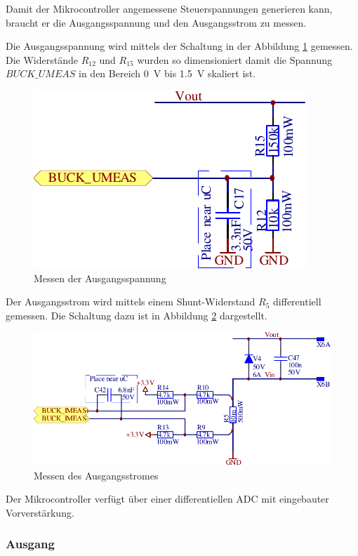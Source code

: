 Damit der Mikrocontroller angemessene Steuerspannungen  generieren kann, braucht
er die Ausgangsspannung und den Ausgangsstrom zu messen.

Die   Ausgangsspannung   wird   mittels   der   Schaltung   in   der   Abbildung
\ref{fig:circuit:buck:umeas} gemessen. Die Widerst\"ande $R_{12}$  und  $R_{15}$
wurden  so  dimensioniert  damit  die  Spannung  $BUCK\_UMEAS$  in  den  Bereich
\SI{0}{\volt} bis \SI{1.5}{\volt} skaliert ist.

\begin{figure}[th!]
    \center
    \includegraphics[width=.45\textwidth]{images/circuit/buck-umeas.pdf}
    \caption{Messen der Ausgangsspannung}
    \label{fig:circuit:buck:umeas}
\end{figure}

Der  Ausgangsstrom  wird  mittels  einem  Shunt-Widerstand  $R_5$  differentiell
gemessen.  Die  Schaltung dazu  ist  in  Abbildung  \ref{fig:circuit:buck:imeas}
dargestellt.

\begin{figure}[th!]
    \center
    \includegraphics[width=.85\textwidth]{images/circuit/buck-imeas.pdf}
    \caption{Messen des Ausgangsstromes}
    \label{fig:circuit:buck:imeas}
\end{figure}

Der  Mikrocontroller verf\"ugt \"uber einer differentiellen ADC mit  eingebauter
Vorverst\"arkung.

\subsubsection*{Ausgang}

